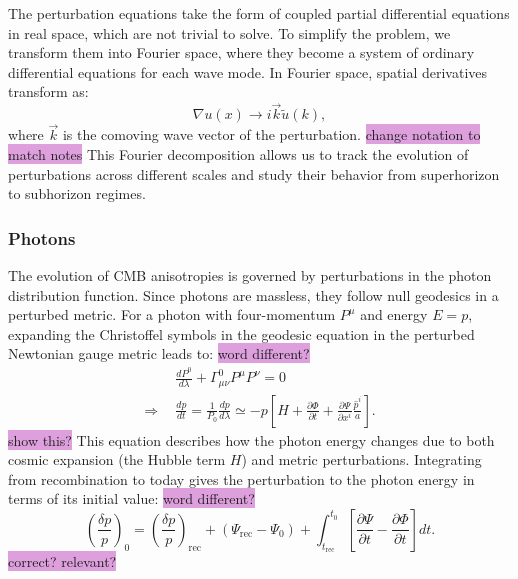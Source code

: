 \documentclass{aa}
\numberwithin{equation}{section}
\numberwithin{table}{section}
\numberwithin{figure}{section}
\begin{document}

The perturbation equations take the form of coupled partial differential equations in real space, which are not trivial to solve. To simplify the problem, we transform them into Fourier space, where they become a system of ordinary differential equations for each wave mode. 
In Fourier space, spatial derivatives transform as:  
\begin{equation}
\nabla u(x) \rightarrow i \vec{k} \tilde{u}(k),
\end{equation}
where $\vec{k}$ is the comoving wave vector of the perturbation. \colorbox{Plum}{change notation to match notes} This Fourier decomposition allows us to track the evolution of perturbations across different scales and study their behavior from superhorizon to subhorizon regimes. 


\subsubsection{Photons}
The evolution of CMB anisotropies is governed by perturbations in the photon distribution function. Since photons are massless, they follow null geodesics in a perturbed metric. For a photon with four-momentum $P^\mu$ and energy $E=p$, expanding the Christoffel symbols in the geodesic equation in the perturbed Newtonian gauge metric leads to: \colorbox{Plum}{word different?}
\begin{align}
&\frac{dP^0}{d\lambda} + \Gamma^0_{\mu\nu} P^\mu P^\nu = 0 \\
\Rightarrow\hspace{5pt} &\frac{dp}{dt} = \frac{1}{P_0}\frac{dp}{d\lambda} \simeq -p\left[H + \frac{\partial \Phi}{\partial t} + \frac{\partial \Psi}{\partial x^{i}}\frac{\hat{p}^{i}}{a}\right].
\end{align}
\colorbox{Plum}{show this?} This equation describes how the photon energy changes due to both cosmic expansion (the Hubble term $H$) and metric perturbations. Integrating from recombination to today gives the perturbation to the photon energy in terms of its initial value: \colorbox{Plum}{word different?}
\begin{equation}
\left(\frac{\delta p}{p}\right)_0 = \left(\frac{\delta p}{p}\right)_{\text{rec}} + \left(\Psi_{\text{rec}} - \Psi_0\right) + \int_{t_{\text{rec}}}^{t_0} \left[\frac{\partial\Psi}{\partial t} - \frac{\partial \Phi}{\partial t} \right] dt. \label{eq: photon momentum}
\end{equation}
\colorbox{Plum}{correct? relevant?}
\end{document}
